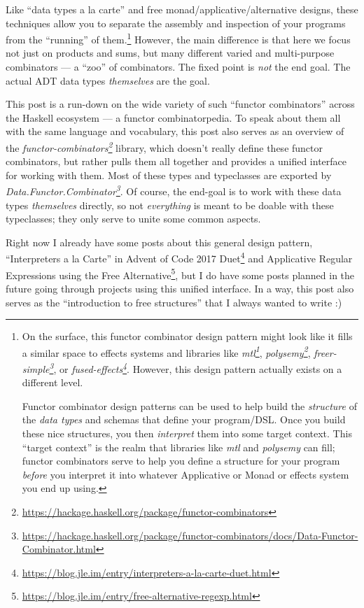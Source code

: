 \documentclass[]{article}
\renewcommand{\href}[2]{#2\footnote{\url{#1}}}
\begin{document}
Like ``data types a la carte'' and free monad/applicative/alternative designs,
these techniques allow you to separate the assembly and inspection of your
programs from the ``running'' of them.\footnote{On the surface, this functor
  combinator design pattern might look like it fills a similar space to effects
  systems and libraries like
  \emph{\href{https://hackage.haskell.org/package/mtl}{mtl}},
  \emph{\href{https://hackage.haskell.org/package/polysemy}{polysemy}},
  \emph{\href{https://hackage.haskell.org/package/freer-simple}{freer-simple}},
  or
  \emph{\href{https://hackage.haskell.org/package/fused-effects}{fused-effects}}.
  However, this design pattern actually exists on a different level.

  Functor combinator design patterns can be used to help build the
  \emph{structure} of the \emph{data types} and schemas that define your
  program/DSL. Once you build these nice structures, you then \emph{interpret}
  them into some target context. This ``target context'' is the realm that
  libraries like \emph{mtl} and \emph{polysemy} can fill; functor combinators
  serve to help you define a structure for your program \emph{before} you
  interpret it into whatever Applicative or Monad or effects system you end up
  using.} However, the main difference is that here we focus not just on
products and sums, but many different varied and multi-purpose combinators --- a
``zoo'' of combinators. The fixed point is \emph{not} the end goal. The actual
ADT data types \emph{themselves} are the goal.

This post is a run-down on the wide variety of such ``functor combinators''
across the Haskell ecosystem --- a functor combinatorpedia. To speak about them
all with the same language and vocabulary, this post also serves as an overview
of the
\emph{\href{https://hackage.haskell.org/package/functor-combinators}{functor-combinators}}
library, which doesn't really define these functor combinators, but rather pulls
them all together and provides a unified interface for working with them. Most
of these types and typeclasses are exported by
\emph{\href{https://hackage.haskell.org/package/functor-combinators/docs/Data-Functor-Combinator.html}{Data.Functor.Combinator}}.
Of course, the end-goal is to work with these data types \emph{themselves}
directly, so not \emph{everything} is meant to be doable with these typeclasses;
they only serve to unite some common aspects.

Right now I already have some posts about this general design pattern,
\href{https://blog.jle.im/entry/interpreters-a-la-carte-duet.html}{``Interpreters
a la Carte'' in Advent of Code 2017 Duet} and
\href{https://blog.jle.im/entry/free-alternative-regexp.html}{Applicative
Regular Expressions using the Free Alternative}, but I do have some posts
planned in the future going through projects using this unified interface. In a
way, this post also serves as the ``introduction to free structures'' that I
always wanted to write :)
\end{document}
